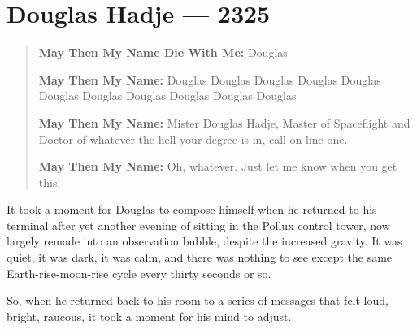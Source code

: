 \hypertarget{douglas-hadje-2325}{%
\chapter{Douglas Hadje — 2325}\label{douglas-hadje-2325}}

\begin{quote}
\textbf{May Then My Name Die With Me:} Douglas

\textbf{May Then My Name:} Douglas Douglas Douglas Douglas Douglas Douglas Douglas Douglas Douglas Douglas Douglas

\textbf{May Then My Name:} Mister Douglas Hadje, Master of Spaceflight and Doctor of whatever the hell your degree is in, call on line one.

\textbf{May Then My Name:} Oh, whatever. Just let me know when you get this!
\end{quote}

\noindent It took a moment for Douglas to compose himself when he returned to his terminal after yet another evening of sitting in the Pollux control tower, now largely remade into an observation bubble, despite the increased gravity. It was quiet, it was dark, it was calm, and there was nothing to see except the same Earth-rise-moon-rise cycle every thirty seconds or so.

So, when he returned back to his room to a series of messages that felt loud, bright, raucous, it took a moment for his mind to adjust.

